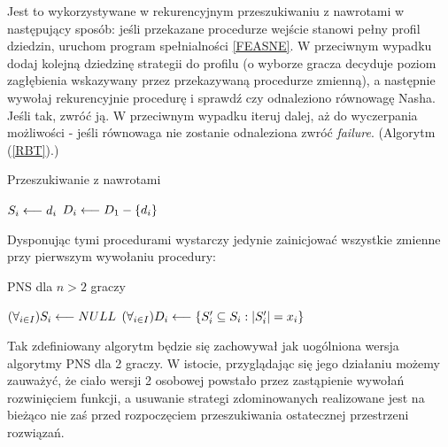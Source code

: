 \documentclass[polish]{standalone}
\begin{document}
Jest to wykorzystywane w rekurencyjnym przeszukiwaniu z nawrotami w następujący sposób: jeśli przekazane procedurze
wejście stanowi pełny profil dziedzin, uruchom program spełnialności \ref{FEASNE}. W przeciwnym wypadku dodaj kolejną
dziedzinę strategii do profilu (o wyborze gracza decyduje poziom zagłębienia wskazywany przez przekazywaną procedurze
zmienną), a następnie wywołaj rekurencyjnie procedurę i sprawdź czy odnaleziono równowagę Nasha. Jeśli tak, zwróć ją.
W przeciwnym wypadku iteruj dalej, aż do wyczerpania możliwości - jeśli równowaga nie zostanie odnaleziona zwróć
\textit{failure}. (Algorytm (\ref{RBT}).)

\begin{algorithm}
\caption{Przeszukiwanie z nawrotami}
\label{RBT}
\begin{algorithmic}
 \ELSE
 \ENDIF
\ELSE
  \STATE $S_i \longleftarrow d_i$
  \STATE $D_i \longleftarrow D_1 - \{ d_i \}$
  \ENDIF
 \ENDFOR 
\ENDIF
\end{algorithmic}
\end{algorithm}

Dysponując tymi procedurami wystarczy jedynie zainicjować wszystkie zmienne przy pierwszym wywołaniu procedury:

\begin{algorithm}
\caption{PNS dla $n > 2$ graczy}
\label{PNSN}
\begin{algorithmic}
 \STATE $(\forall_{i \in I}) S_i \longleftarrow NULL$
 \STATE $(\forall_{i \in I}) D_i \longleftarrow \{ S_i' \subseteq S_i : |S_i'| = x_i \}$
 \ENDIF
\ENDFOR
\end{algorithmic}
\end{algorithm}

Tak zdefiniowany algorytm będzie się zachowywał jak uogólniona wersja algorytmy PNS dla 2 graczy. W istocie,
przyglądając się jego działaniu możemy zauważyć, że ciało wersji 2 osobowej powstało przez zastąpienie wywołań
rozwinięciem funkcji, a usuwanie strategi zdominowanych realizowane jest na bieżąco nie zaś przed rozpoczęciem
przeszukiwania ostatecznej przestrzeni rozwiązań. 
\end{document}
